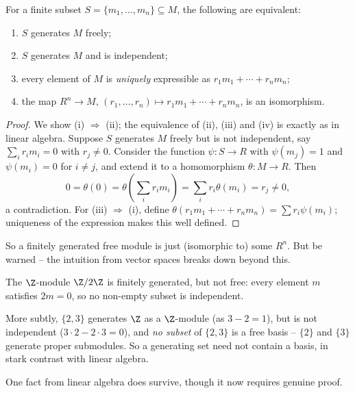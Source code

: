 \begin{proposition}
	For a finite subset $S = \{m_1, \dots, m_n\} \subseteq M$, the following are equivalent:
	\begin{enumerate}[label=(\roman*)]
		\item $S$ generates $M$ freely;
		\item $S$ generates $M$ and is independent;
		\item every element of $M$ is \emph{uniquely} expressible as $r_1 m_1 + \cdots + r_n m_n$;
		\item the map $R^n \rightarrow M$, $(r_1, \dots, r_n) \mapsto r_1 m_1 + \cdots + r_n m_n$, is an isomorphism.
	\end{enumerate}
\end{proposition}
\begin{proof}
	We show (i) $\Rightarrow$ (ii); the equivalence of (ii), (iii) and (iv) is exactly as in linear algebra. Suppose $S$ generates $M$ freely but is not independent, say $\sum_i r_i m_i = 0$ with $r_j \neq 0$. Consider the function $\psi: S \rightarrow R$ with $\psi(m_j) = 1$ and $\psi(m_i) = 0$ for $i \neq j$, and extend it to a homomorphism $\theta: M \rightarrow R$. Then
	$$
	0 = \theta(0) = \theta\left(\sum_i r_i m_i\right) = \sum_i r_i \theta(m_i) = r_j \neq 0,
	$$
	a contradiction. For (iii) $\Rightarrow$ (i), define $\theta(r_1m_1 + \cdots + r_nm_n) = \sum r_i \psi(m_i)$; uniqueness of the expression makes this well defined.
\end{proof}

So a finitely generated free module is just (isomorphic to) some $R^n$. But be warned -- the intuition from vector spaces breaks down beyond this.

\begin{example}
	The $\Z$-module $\Z/2\Z$ is finitely generated, but not free: every element $m$ satisfies $2m = 0$, so no non-empty subset is independent.

	More subtly, $\{2, 3\}$ generates $\Z$ as a $\Z$-module (as $3 - 2 = 1$), but is not independent ($3 \cdot 2 - 2 \cdot 3 = 0$), and \emph{no subset} of $\{2, 3\}$ is a free basis -- $\{2\}$ and $\{3\}$ generate proper submodules. So a generating set need not contain a basis, in stark contrast with linear algebra.
\end{example}

One fact from linear algebra does survive, though it now requires genuine proof.

